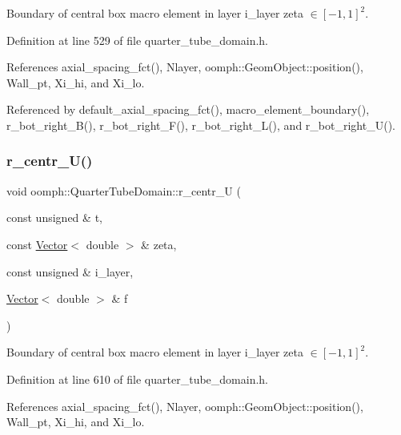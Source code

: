 Boundary of central box macro element in layer i\+\_\+layer zeta $ \in [-1,1]^2 $. 



Definition at line 529 of file quarter\+\_\+tube\+\_\+domain.\+h.



References axial\+\_\+spacing\+\_\+fct(), Nlayer, oomph\+::\+Geom\+Object\+::position(), Wall\+\_\+pt, Xi\+\_\+hi, and Xi\+\_\+lo.



Referenced by default\+\_\+axial\+\_\+spacing\+\_\+fct(), macro\+\_\+element\+\_\+boundary(), r\+\_\+bot\+\_\+right\+\_\+\+B(), r\+\_\+bot\+\_\+right\+\_\+\+F(), r\+\_\+bot\+\_\+right\+\_\+\+L(), and r\+\_\+bot\+\_\+right\+\_\+\+U().

\mbox{\label{classoomph_1_1QuarterTubeDomain_afb2013af63e8207676102ee16d856dca}} 
\subsubsection{\texorpdfstring{r\+\_\+centr\+\_\+\+U()}{r\_centr\_U()}}
{\footnotesize\ttfamily void oomph\+::\+Quarter\+Tube\+Domain\+::r\+\_\+centr\+\_\+U (\begin{DoxyParamCaption}\item[{const unsigned \&}]{t,  }\item[{const \hyperlink{classoomph_1_1Vector}{Vector}$<$ double $>$ \&}]{zeta,  }\item[{const unsigned \&}]{i\+\_\+layer,  }\item[{\hyperlink{classoomph_1_1Vector}{Vector}$<$ double $>$ \&}]{f }\end{DoxyParamCaption})\hspace{0.3cm}{\ttfamily [private]}}



Boundary of central box macro element in layer i\+\_\+layer zeta $ \in [-1,1]^2 $. 



Definition at line 610 of file quarter\+\_\+tube\+\_\+domain.\+h.



References axial\+\_\+spacing\+\_\+fct(), Nlayer, oomph\+::\+Geom\+Object\+::position(), Wall\+\_\+pt, Xi\+\_\+hi, and Xi\+\_\+lo.



